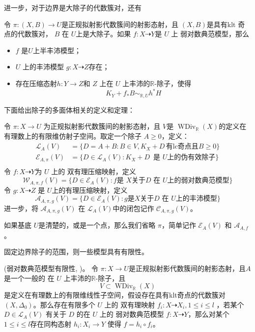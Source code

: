 进一步，对于边界是大除子的代数簇对，还有
\begin{lemma}\cite[Lemma 3.9.3]{BCHM10} 令 $ \pi:(X,B)\to U $是正规拟射影代数簇间的射影态射，且 $(X, B)$是具有klt 奇点的代数簇对，  $B$ 在 $U$上是大除子。如果 $f:X\dashrightarrow Y$是 $U$ 上 弱对数典范模型，那么
  \begin{itemize}
    \item $f$ 是$U$上半丰沛模型；
    \item  $U$ 上的丰沛模型  $g:X \dashrightarrow Z$存在；
    \item  存在压缩态射$h:Y\to Z$和 $Z$ 上在 $U$ 上丰沛的$\mathbb{R}$-除子，使得 
      \[ K_{Y}+f_*B\sim_{\mathbb{R},U} h^*H \]
  \end{itemize}
\end{lemma}
下面给出除子的多面体相关的定义和定理：
\begin{definition}\label{polytopeofdivisor}
  \cite[Definition 1.1.4]{BCHM10} 令 $ \pi: X\to U $ 为正规拟射影代数簇间的射影态射，且 $ V $是 $ \operatorname{WDiv}_{\mathbb{R}}(X) $的定义在有理数上的有限维仿射子空间。取定一个除子 $ A\geqslant 0 $，定义：
  \[
    \begin{aligned}
      \mathcal{L}_A(V)       & =\{D=A+B:B \in V,  K_X+D\, \text{有lc奇点且} B\geqslant0 \} \\
    \mathcal{E}_{A,\pi}(V) & =\{D\in \mathcal{L}_A(V): K_X+D\, \text{ 是 } U \text{上的伪有效除子}\}  \\
    \end{aligned}
  \]
  令 $ f:X \dashrightarrow Y$为 $U$ 上的 双有理压缩映射，定义
  \[ \mathcal{W}_{A,\pi,f}(V)=\{D\in \mathcal{E}_{A}(V): f \text{是   } X \text{关于}D \text{ 在 }U \text{上的弱对数典范模型}\} \]
  令 $g:X\dashrightarrow Z  $ 是 $ U $上的有理压缩映射，定义
  \[ \mathcal{A}_{A,\pi,g}(V)=\{D\in \mathcal{E}_{A}(V): g \text{是} X \text{关于}D\text{ 在 }U \text{上的丰沛模型}\} \]
  进一步，将 $ \mathcal{A}_{A,\pi,g}(V) $ 在 $\mathcal{L}_{A}(V)$中的闭包记作 $ \mathcal{C}_{A,\pi,g}(V) $。

  如果基底 $U$是清楚的，或是一个点，那么我们省略 $\pi$，简单记作 $\mathcal{E}_{A}(V)$ 和 $\mathcal{A}_{A,f}$。
\end{definition}
固定边界除子的范围，则一些模型具有有限性。
\begin{theorem}\label{finitewlcm}
  (弱对数典范模型有限性, \cite[Theorem E]{BCHM10})。
  令 $\pi: X\to U$是正规拟射影代数簇间的射影态射，且$A$是一个一般的 在 $U$ 上丰沛的$\mathbb{R}$-除子，且
    \[ V \subset \operatorname{WDiv}_{\mathbb{R}}(X) \]
  是定义在有理数上的有限维线性子空间，假设存在具有klt奇点的代数簇对 $(X,\Delta_{0})$。那么存在有限多个 $U$ 上的 双有理映射 $f_{i}:X \dashrightarrow X_{i},1\leqslant i\leqslant l$ ，若某个 $D \in \mathcal{L}_{A}(V)$ 有关于 $D$ 的在 $U$ 上的  弱对数典范模型 $f:X \dashrightarrow  Y$，那么对某个$1\leqslant i\leqslant l$存在同构态射  $h_{i}:X_{i} \to Y$ 使得 $f=h_{i}\circ f_{i}$。
\end{theorem}
